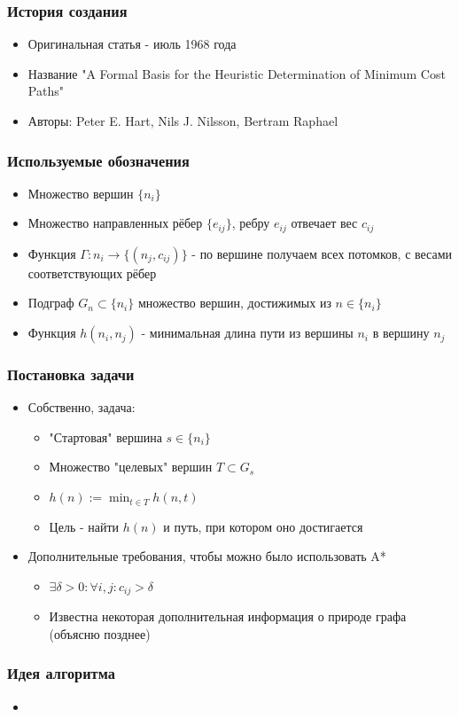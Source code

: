 \documentclass{style}
\begin{document}
 
\begin{frame}[plain]
    \titlepage
\end{frame}

\begin{frame}
    \frametitle{История создания}
    \begin{itemize}
        \item Оригинальная статья - июль 1968 года
        \item Название "A Formal Basis for the Heuristic Determination of Minimum Cost Paths"
        \item Авторы: Peter E. Hart, Nils J. Nilsson, Bertram Raphael
    \end{itemize}
\end{frame}

\begin{frame}
    \frametitle{Используемые обозначения}
    \begin{itemize}
        \item Множество вершин $\{n_i\}$
        \item Множество направленных рёбер $\{e_{ij}\}$, ребру $e_{ij}$ отвечает вес $c_{ij}$
        \item Функция $\Gamma : n_i \rightarrow \{(n_j, c_{ij})\}$ - по вершине получаем всех 
              потомков, с весами соответствующих рёбер
        \item Подграф $G_n \subset \{n_i\}$ множество вершин, достижимых из $n \in \{n_i\}$ 
        \item Функция $h(n_i, n_j)$ - минимальная длина пути из вершины $n_i$ в вершину $n_j$
    \end{itemize}
\end{frame}

\begin{frame}
    \frametitle{Постановка задачи}
    \begin{itemize}
        \item Собственно, задача:
        \begin{itemize}
            \item "Стартовая" \; вершина $s \in \{n_i\}$
            \item Множество "целевых" \; вершин $T \subset G_s$
            \item \(\displaystyle h(n) := \min _{t \in T} h(n, t) \)
            \item Цель - найти $h(n)$ и путь, при котором оно достигается
        \end{itemize}
        \item Дополнительные требования, чтобы можно было использовать A*
        \begin{itemize}
            \item $\exists \delta > 0 : \forall i,j : c_{ij} > \delta$
            \item Известна некоторая дополнительная информация о природе графа (объясню позднее)
        \end{itemize}
    \end{itemize}
\end{frame}

\begin{frame}
    \frametitle{Идея алгоритма}
    \begin{itemize}
        \item 
    \end{itemize}
\end{frame}
\end{document}
